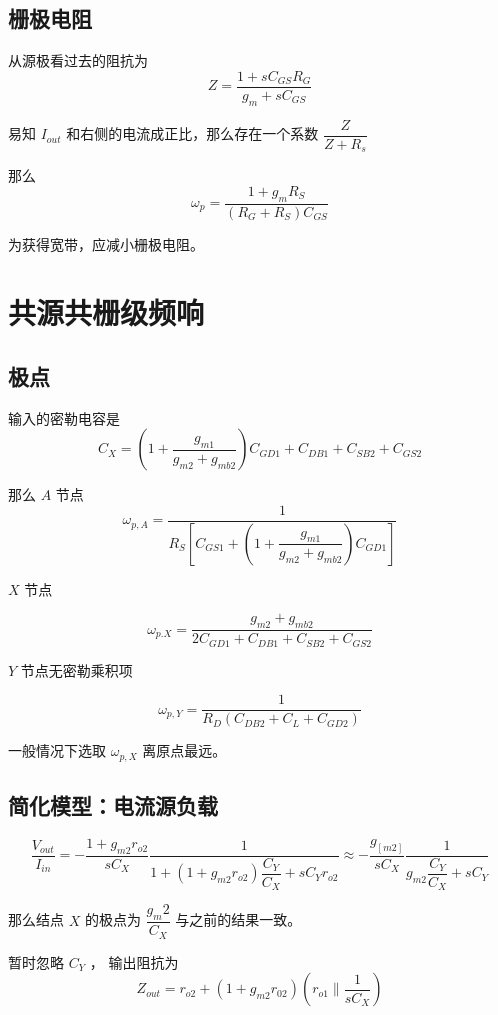 \documentclass[cn,11pt,chinese,black,simple]{../elegantbook}
\begin{document}
\subsection{栅极电阻}

从源极看过去的阻抗为 \[Z = \frac{1 + s C_{GS}R_G}{g_m + s C_{GS}}\]

易知 \(I_{out}\) 和右侧的电流成正比，那么存在一个系数 \(\dfrac{Z}{Z + R_s}\)

那么 \[\omega_p = \frac{1+ g_m R_S}{(R_G + R_S)C_{GS}}\]

为获得宽带，应减小栅极电阻。


\section{共源共栅级频响}

\subsection{极点}

输入的密勒电容是 \[C_X = (1 + \frac{g_{m1}}{g_{m2} + g_{mb2}})C_{GD1} + C_{DB1} + C_{SB2} + C_{GS2}\]

那么 \(A\) 节点 \[\omega_{p,A} = \frac{1}{R_S\left[C_{GS1}+(1 + \dfrac{g_{m1}}{g_{m2} + g_{mb2}})C_{GD1}\right]}\]

\(X\) 节点

\[\omega_{p.X} = \frac{g_{m2} + g_{mb2}}{2 C_{GD1} + C_{DB1} + C_{SB2} + C_{GS2}}\]


\(Y\) 节点无密勒乘积项

\[\omega_{p,Y} = \frac{1}{R_D (C_{DB2} + C_L + C_{GD2})}\]

一般情况下选取 \(\omega_{p,X}\) 离原点最远。


\subsection{简化模型：电流源负载}

\[\frac{V_{out}}{I_{in}} = -\frac{1 + g_{m2} r_{o2}}{s C_X} \frac{1}{1 + (1 + g_{m2} r_{o2} ) \dfrac{C_Y}{C_X}+ s C_Y r_{o2} } \approx - \frac{g_[m2]}{s C_X} \frac{1}{g_{m2} \dfrac{C_Y}{C_X} + s C_Y}  \]

那么结点 \(X\) 的极点为 \(\dfrac{g_m2}{C_X}\) 与之前的结果一致。

暂时忽略 \(C_Y\) ，
输出阻抗为 \[Z_{out} = r_{o2} + (1 + g_{m2} r_{02}) \left(r_{o1} \| \dfrac{1}{s C_X}\right)\]
\end{document}
